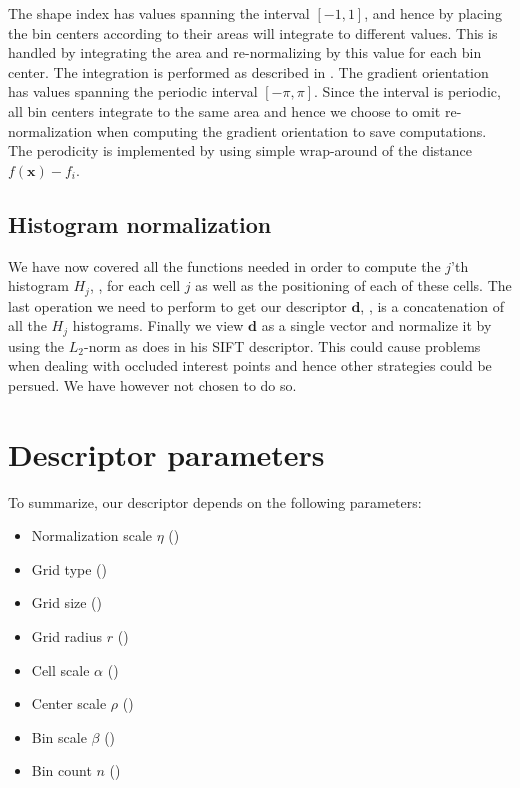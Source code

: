 \documentclass[thesis.tex]{subfiles}
\def\x{\mathbf{x}}
\def\d{\mathbf{d}}
\begin{document}
The shape index has values spanning the interval $[-1,1]$, and hence by placing the bin centers according to  their areas will integrate to different values. This is handled by integrating the area and re-normalizing by this value for each bin center. The integration is performed as described in . The gradient orientation has values spanning the periodic interval $[-\pi,\pi]$. Since the interval is periodic, all bin centers integrate to the same area and hence we choose to omit re-normalization when computing the gradient orientation to save computations. The perodicity is implemented by using simple wrap-around of the distance $f(\x) - f_i$.
%
\subsection{Histogram normalization}
%
We have now covered all the functions needed in order to compute the $j$'th histogram $H_j$, , for each cell $j$ as well as the positioning of each of these cells. The last operation we need to perform to get our descriptor $\d$, , is a concatenation of all the $H_j$ histograms. Finally we view $\d$ as a single vector and normalize it by using the $L_2$-norm as \citet{lowe2004distinctive} does in his SIFT descriptor. This could cause problems when dealing with occluded interest points and hence other strategies could be persued. We have however not chosen to do so.
%
\section{Descriptor parameters}
\label{sec:descriptorParameters}
%
To summarize, our descriptor depends on the following parameters:
%
\begin{itemize}
\item Normalization scale $\eta$ ()
\item Grid type ()
\item Grid size ()
\item Grid radius $r$ ()
\item Cell scale $\alpha$ ()
\item Center scale $\rho$ ()
\item Bin scale $\beta$ ()
\item Bin count $n$ ()
\end{itemize}
%
\end{document}
